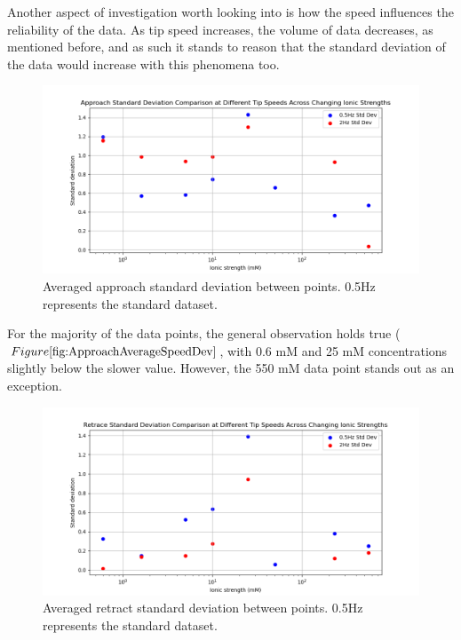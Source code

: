 Another aspect of investigation worth looking into is how the speed influences the reliability of the data. As tip speed increases, the volume of data decreases, as mentioned before, and as such it stands to reason that the standard deviation of the data would increase with this phenomena too.

\begin{figure}[h!]
\centering
\includegraphics[width=\textwidth]{chapter7/Tip speed/Standard deviation change.png}
\caption{Averaged approach standard deviation between points. 0.5Hz represents the standard dataset.}
\label{fig:ApproachAverageSpeedDev}
\end{figure}

For the majority of the data points, the general observation holds true ($Figure \ref{fig:ApproachAverageSpeedDev}$, with 0.6 mM and 25 mM concentrations slightly below the slower value. However, the 550 mM data point stands out as an exception. 


\begin{figure}[h!!!]
\centering
\includegraphics[width=\textwidth]{chapter7/Tip speed/Standard deviation change retract.png}
\caption{Averaged retract standard deviation between points. 0.5Hz represents the standard dataset.}
\label{fig:RetractAverageSpeedDev}
\end{figure}

